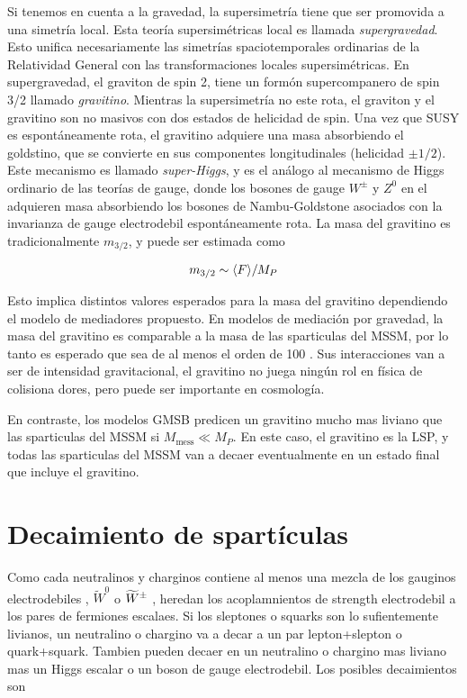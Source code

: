 Si tenemos en cuenta a la gravedad, la supersimetría tiene que ser
promovida a una simetría local. Esta teoría supersimétricas local
es llamada \emph{supergravedad}. Esto unifica necesariamente las
simetrías spaciotemporales ordinarias de la Relatividad General
con las transformaciones locales supersimétricas. En supergravedad,
el graviton de spin 2, tiene un formón supercompanero de spin 3/2
llamado \emph{gravitino}. Mientras la supersimetría no este rota,
el graviton y el gravitino son no masivos con dos estados de helicidad
de spin. Una vez que SUSY es espontáneamente rota, el gravitino adquiere
una masa absorbiendo el goldstino, que se convierte en sus componentes
longitudinales (helicidad $\pm 1/2$). Este mecanismo es llamado \emph{super-Higgs},
y es el análogo al mecanismo de Higgs ordinario de las teorías de gauge,
donde los bosones de gauge $W^\pm$ y $Z^0$ en el {\SM} adquieren
masa absorbiendo los bosones de Nambu-Goldstone asociados con la
invarianza de gauge electrodebil espontáneamente rota. La masa del
gravitino es tradicionalmente $m_{3/2}$, y puede ser estimada como

\begin{equation}
  m_{3/2} \sim \langle F \rangle / M_P
\end{equation}

Esto implica distintos valores esperados para la masa del gravitino
dependiendo el modelo de mediadores propuesto. En modelos de mediación
por gravedad, la masa del gravitino es comparable a la masa de las
sparticulas del MSSM, por lo tanto es esperado que sea de al menos
el orden de 100 \gev. Sus interacciones van a ser de intensidad
gravitacional, el gravitino no juega ningún rol en física de
colisiona dores, pero puede ser importante en cosmología.

En contraste, los modelos GMSB predicen un gravitino mucho mas
liviano que las sparticulas del MSSM si $M_\text{mess} \ll M_P$.
En este caso, el gravitino es la LSP, y todas las sparticulas
del MSSM van a decaer eventualmente en un estado final que incluye
el gravitino.




\section{Decaimiento de spartículas}

Como cada neutralinos y charginos contiene al menos una mezcla
de los gauginos electrodebiles {\bino}, $\tilde W^0$ o $\widetilde{W}^{\pm}$
, heredan los acoplamnientos de strength electrodebil a los pares
de fermiones escalaes. Si los sleptones o squarks son lo sufientemente
livianos, un neutralino o chargino va a decar a un par lepton+slepton
o quark+squark. Tambien pueden decaer en un neutralino o chargino
mas liviano mas un Higgs escalar o un boson de gauge electrodebil.
Los posibles decaimientos son

